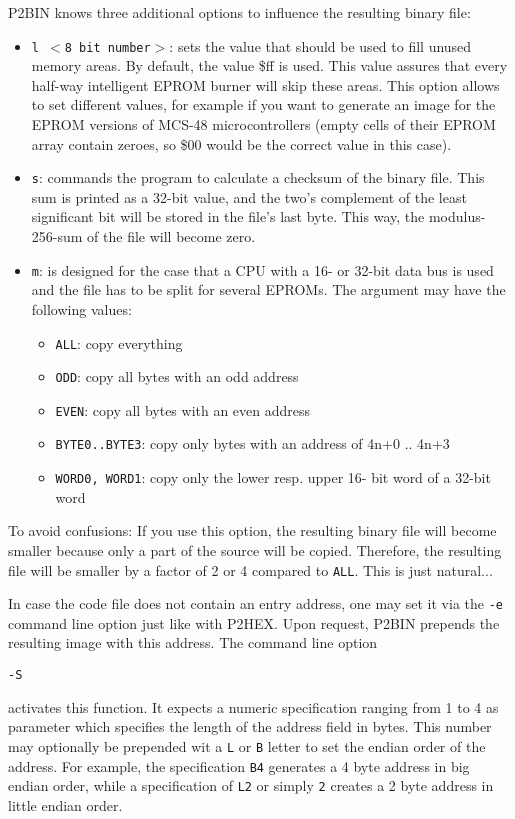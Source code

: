 \documentclass[12pt,twoside]{report}
\newcommand{\tty}[1]{{\tt #1}}
\begin{document}
P2BIN knows three additional options to influence the resulting binary
file:
\begin{itemize}
\item{\tty{l $<$8 bit number$>$}: sets the value that should be used to fill
      unused memory areas.  By default, the value
      \$ff is used.  This value assures that every
      half-way intelligent EPROM burner will skip
      these areas.  This option allows to set different values,
      for example if you want to 
      generate an image for the EPROM versions of 
      MCS-48 microcontrollers (empty cells of their
      EPROM array contain zeroes, so \$00 would be
      the correct value in this case).}
\item{\tty{s}:  commands the program to calculate a checksum
      of the binary file.  This sum is printed as 
      a 32-bit value, and the two's complement of
      the least significant bit will be stored in
      the file's last byte.  This way, the modulus-
      256-sum of the file will become zero.}
\item{\tty{m}:  is designed for the case that a CPU with a 
      16- or 32-bit data bus is used and the file
      has to be split for several EPROMs.  The 
      argument may have the following values:
      \begin{itemize}
      \item{\tty{ALL}: copy everything}
      \item{\tty{ODD}: copy all bytes with an odd address}
      \item{\tty{EVEN}: copy all bytes with an even address}
      \item{\tty{BYTE0..BYTE3}: copy only bytes with an address of
            4n+0 .. 4n+3}
      \item{\tty{WORD0, WORD1}: copy only the lower resp. upper 16-
            bit word of a 32-bit word}
      \end{itemize}}
\end{itemize}
To avoid confusions: If you use this option, the resulting binary file
will become smaller because only a part of the source will be copied. 
Therefore, the resulting file will be smaller by a factor of 2 or 4
compared to \tty{ALL}.  This is just natural...

In case the code file does not contain an entry address, one may set
it via the \tty{-e} command line option just like with P2HEX.  Upon
request, P2BIN prepends the resulting image with this address.  The
command line option
\begin{verbatim}
-S 
\end{verbatim}
activates this function.  It expects a numeric specification ranging
from 1 to 4 as parameter which specifies the length of the address
field in bytes.  This number may optionally be prepended wit a \tty{L} or
\tty{B} letter to set the endian order of the address.  For example, the
specification \tty{B4} generates a 4 byte address in big endian order,
while a specification of \tty{L2} or simply \tty{2} creates a 2 byte address
in little endian order.
\end{document}
